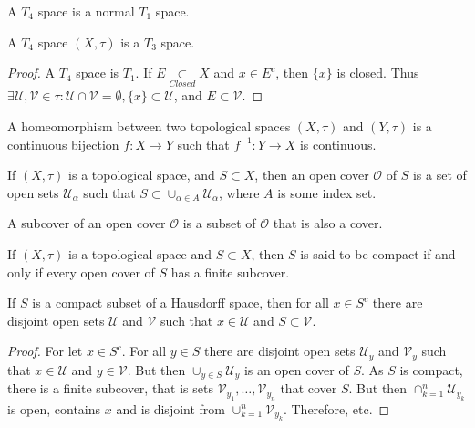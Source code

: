         \begin{definition}
        A $T_4$ space is a normal $T_1$ space.
        \end{definition}
        \begin{theorem}
        A $T_4$ space $(X,\tau)$ is a $T_3$ space.
        \end{theorem}
        \begin{proof}
        A $T_4$ space is $T_1$. If $E\underset{Closed}\subset X$ and $x\in E^c$, then $\{x\}$ is closed. Thus $\exists \mathcal{U},\mathcal{V}\in\tau: \mathcal{U}\cap\mathcal{V}=\emptyset, \{x\}\subset \mathcal{U}$, and $E\subset \mathcal{V}$.
        \end{proof}
        \begin{definition}
        A homeomorphism between two topological spaces $(X,\tau)$ and $(Y,\tau)$ is a continuous bijection $f:X\rightarrow Y$ such that $f^{-1}:Y\rightarrow X$ is continuous.
        \end{definition}
        \begin{definition}
        If $(X,\tau)$ is a topological space, and $S\subset X$, then an open cover $\mathcal{O}$ of $S$ is a set of open sets $\mathcal{U}_{\alpha}$ such that $S\subset \cup_{\alpha\in A} \mathcal{U}_{\alpha}$, where $A$ is some index set.
        \end{definition}
        \begin{definition}
        A subcover of an open cover $\mathcal{O}$ is a subset of $\mathcal{O}$ that is also a cover.
        \end{definition}
        \begin{definition}
        If $(X,\tau)$ is a topological space and $S\subset X$, then $S$ is said to be compact if and only if every open cover of $S$ has a finite subcover.
        \end{definition}
        \begin{theorem}
        If $S$ is a compact subset of a Hausdorff space, then for all $x\in S^c$ there are disjoint open sets $\mathcal{U}$ and $\mathcal{V}$ such that $x\in \mathcal{U}$ and $S\subset \mathcal{V}$.
        \end{theorem}
        \begin{proof}
        For let $x\in S^c$. For all $y\in S$ there are disjoint open sets $\mathcal{U}_y$ and $\mathcal{V}_y$ such that $x\in \mathcal{U}$ and $y\in \mathcal{V}$. But then $\cup_{y\in S} \mathcal{U}_y$ is an open cover of $S$. As $S$ is compact, there is a finite subcover, that is sets $\mathcal{V}_{y_1},\hdots, \mathcal{V}_{y_n}$ that cover $S$. But then $\cap_{k=1}^{n} \mathcal{U}_{y_k}$ is open, contains $x$ and is disjoint from $\cup_{k=1}^{n} \mathcal{V}_{y_k}$. Therefore, etc.
        \end{proof}
